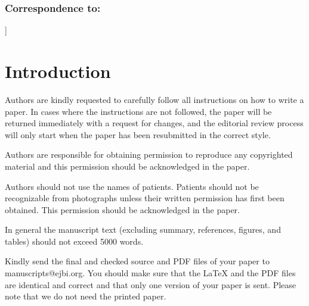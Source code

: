 \documentclass[a4paper,10pt,twocolumn,twoside,openright]{article}
\begin{document}
\smallskip
\colorbox{light-gray}{\begin{minipage}{9cm}
\begin{footnotesize}
\subsubsection*{Correspondence to:}
\end{footnotesize}
\end{minipage} \hfill \begin{minipage}{8.5cm}
\begin{footnotesize}
\end{footnotesize}
\end{minipage}}

\vspace{1cm}
]


\section{Introduction}

Authors are kindly requested to carefully follow all instructions on how to write a paper. In cases where the instructions are not followed, the paper will be returned immediately with a request for changes, and the editorial review process will only start when the paper has been resubmitted in the correct style.

Authors are responsible for obtaining permission to reproduce any copyrighted material and this permission should be acknowledged in the paper.

Authors should not use the names of patients. Patients should not be recognizable from photographs unless their written permission has first been obtained. This permission should be acknowledged in the paper.

In general the manuscript text (excluding summary, re\-ferences, figures, and tables) should not exceed 5000 words.

Kindly send the final and checked source and PDF files of your paper to manuscripts@ejbi.org. You should make sure that the \LaTeX{} and the PDF files are identical and correct and that only one version of your paper is sent. Please note that we do not need the printed paper.
\end{document}
